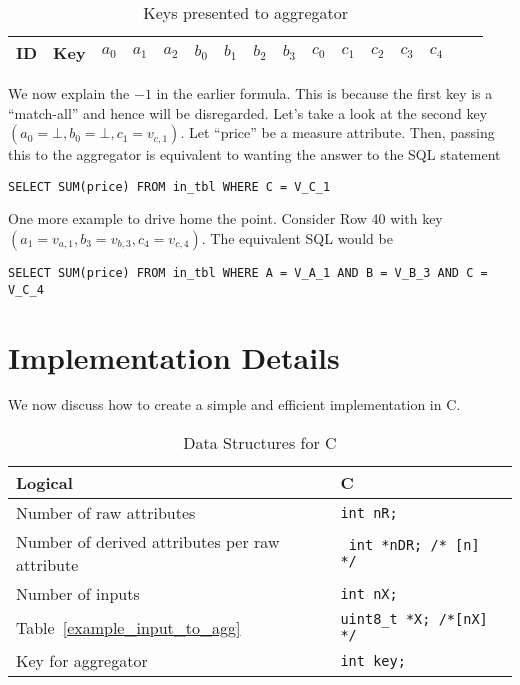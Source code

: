 \newpage
{\small 
\begin{table}[hbtp]
\centering
\begin{tabular}{|c|l|l|l|l|l|l|l|l|l|l|l|l|l|l|l|} \hline \hline
{\bf ID} & {\bf Key} & \(a_0\) & \(a_1\) & \(a_2\) & 
\(b_0\) & \(b_1\) & \(b_2\) & \(b_3\) &
\(c_0\) & \(c_1\) & \(c_2\) & \(c_3\) & \(c_4\) \\ \hline \hline

\end{tabular}
\caption{Keys presented to aggregator}
\label{example_keys_to_aggregator}
\end{table}
}

We now explain the \(-1\) in the earlier formula. This is because 
the first key is a ``match-all'' and hence will be disregarded. 
Let's take a look at the second key 
 \((a_0 = \bot, b_0 = \bot, c_1 = v_{c, 1})\). Let ``price'' be a measure
 attribute. Then, passing this to the aggregator is equivalent to wanting the
 answer to the SQL statement
 \begin{verbatim}
SELECT SUM(price) FROM in_tbl WHERE C = V_C_1
 \end{verbatim}
One more example to drive home the point. Consider Row 40 with key 
\((a_1 = v_{a, 1}, b_3 = v_{b, 3}, c_4 = v_{c, 4})\). The equivalent SQL would be 

 \begin{verbatim}
SELECT SUM(price) FROM in_tbl WHERE A = V_A_1 AND B = V_B_3 AND C = V_C_4
 \end{verbatim}

\section{Implementation Details}

We now discuss how to create a simple and efficient implementation in C.

\begin{table}[hbtp]
\centering
\begin{tabular}{|l|l|l|} \hline \hline
{\bf Logical } & {\bf C} \\ \hline 
Number of raw attributes & {\tt int nR;} \\ \hline
Number of derived attributes per raw attribute & \verb+ int *nDR; /* [n] */+ \\ \hline
Number of inputs & {\tt int nX;} \\ \hline
Table~\ref{example_input_to_agg} & \verb+uint8_t *X; /*[nX] */+ \\ \hline
Key for aggregator & {\tt int key; } \\ \hline
\end{tabular}
\caption{Data Structures for C}
\label{data_structures_for_C}
\end{table}

